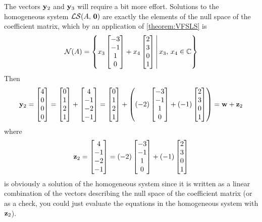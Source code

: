 \documentclass{ximera}
\begin{document}
\begin{example}
  The vectors $\mathbf{y}_2$ and $\mathbf{y}_3$ will require a bit more
  effort.  Solutions to the homogeneous system $\mathcal{LS}\!\left(A,\,\mathbf{0}\right)$ are
  exactly the elements of the null space of the coefficient matrix,
  which by an application of \ref{theorem:VFSLS} is
  \[
    \mathcal{N}\!\left(A\right)=\left\lbrace
      x_3\begin{bmatrix}-3\\-1\\1\\0\end{bmatrix}+x_4\begin{bmatrix}2\\3\\0\\1\end{bmatrix}
    \,\middle|\,
      x_3,\,x_4\in\mathbb{C}
    \right\rbrace
  \]
  Then
  \[
    \mathbf{y}_2=\begin{bmatrix}4\\0\\0\\0\end{bmatrix}
    =\begin{bmatrix}0\\1\\2\\1\end{bmatrix}+\begin{bmatrix}4\\-1\\-2\\-1\end{bmatrix}
    =\begin{bmatrix}0\\1\\2\\1\end{bmatrix}+\left((-2)\begin{bmatrix}-3\\-1\\1\\0\end{bmatrix}+(-1)\begin{bmatrix}2\\3\\0\\1\end{bmatrix}\right)
    =\mathbf{w}+\mathbf{z}_2
  \]
  where
  \[
    \mathbf{z}_2
    =\begin{bmatrix}4\\-1\\-2\\-1\end{bmatrix}
    =(-2)\begin{bmatrix}-3\\-1\\1\\0\end{bmatrix}+(-1)\begin{bmatrix}2\\3\\0\\1\end{bmatrix}
  \]
  is obviously a solution of the homogeneous system since it is
  written as a linear combination of the vectors describing the null
  space of the coefficient matrix (or as a check, you could just
  evaluate the equations in the homogeneous system with $\mathbf{z}_2$).


\end{example}
\end{document}
